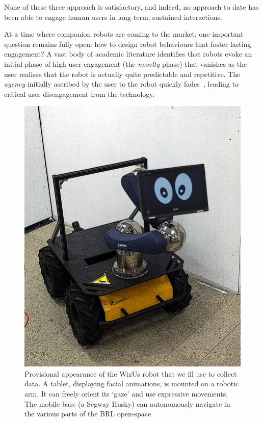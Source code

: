 \documentclass[11pt,a4paper]{report}
\newcommand{\project}{WizUs\xspace}
\begin{document}
None of these three approach is satisfactory, and indeed, no approach to date
has been able to engage human users in long-term, sustained interactions.




At a time where companion robots are coming to the market, one important
question remains fully open: how to design robot behaviours that foster
lasting engagement? A vast body of academic literature identifies that
robots evoke an initial phase of high user engagement (the
\emph{novelty} phase) that vanishes as the user realises that the robot
is actually quite predictable and repetitive. The \emph{agency}
initially ascribed by the user to the robot quickly
fades~\cite{lemaignan2014dynamics}, leading to critical user disengagement from the technology.

\begin{figure}
    \centering
    \includegraphics[width=0.5\paperwidth]{figs/husky.jpg}
    \caption{\label{fig:robot}
    Provisional appearance of the \project robot that we ill use to collect
    data. A tablet, displaying facial animations, is mounted on a robotic arm.
    It can freely orient its `gaze' and use expressive movements. The mobile
    base (a Segway Husky) can autonomously navigate in the various parts of the
    BRL open-space}
\end{figure}
\end{document}
